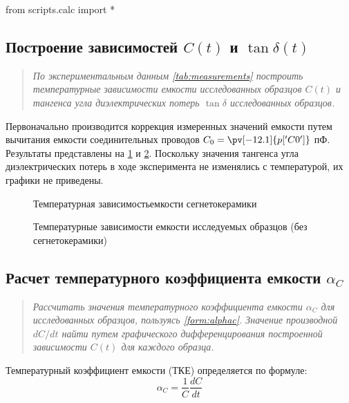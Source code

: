 \begin{python}
from scripts.calc import *
\end{python}

\subsection*{  Построение зависимостей $C(t)$ и $\tan \delta (t)$}
\begin{quote}
    \textit{По экспериментальным данным \cref{tab:measurements} построить температурные зависимости емкости исследованных образцов $C(t)$ и тангенса угла диэлектрических потерь $\tan \delta$ исследованных образцов.}
\end{quote}

Первоначально производится коррекция измеренных значений емкости путем вычитания емкости соединительных проводов $C_0 = \pv[-12.1]{p['C0']}$ пФ. Результаты представлены на \cref{fig:C_vs_t} и \cref{fig:C_vs_t_without}.  Поскольку значения тангенса угла диэлектрических потерь в ходе эксперимента не изменялись с температурой, их графики не приведены.

\begin{figure}[H]
    \centering
    
    \caption{Температурная зависимостьемкости сегнетокерамики}
    \label{fig:C_vs_t}
\end{figure}

\begin{figure}[H]
    \centering
    
    \caption{Температурные зависимости емкости исследуемых образцов (без сегнетокерамики)}
    \label{fig:C_vs_t_without}
\end{figure}

\subsection*{  Расчет температурного коэффициента емкости $\alpha_C$}
\begin{quote} 
    \textit{Рассчитать значения температурного коэффициента емкости $\alpha_C$ для исследованных образцов, пользуясь \cref{form:alphac}. Значение производной $dC/dt$ найти путем графического дифференцирования построенной зависимости $C(t)$ для каждого образца.}
\end{quote}

Температурный коэффициент емкости (ТКЕ) определяется по формуле:
\begin{equation}
    \alpha_C = \frac{1}{C} \frac{dC}{dt}
\end{equation}

